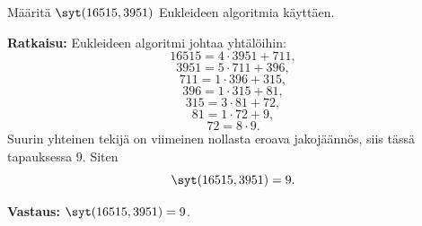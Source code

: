 \begin{esimerkki}
Määritä $\syt(16515,3951)$ Eukleideen
algoritmia käyttäen.

{\bf Ratkaisu:}
Eukleideen algoritmi johtaa yhtälöihin:
\[
16515 = 4 \cdot 3951 + 711,
\]
\[
3951 = 5 \cdot 711 + 396,
\]
\[
711 = 1 \cdot 396 + 315,
\]
\[
396 = 1 \cdot 315 + 81,
\]
\[
315 = 3 \cdot 81 + 72,
\]
\[
81 = 1 \cdot 72 + 9,
\]
\[
72 = 8 \cdot 9.
\]
Suurin yhteinen tekijä on viimeinen nollasta eroava
jakojäännös, siis tässä tapauksessa $9$. Siten
\[
\syt(16515,3951) = 9.
\]

{\bf Vastaus:} $\syt(16515, 3951) = 9$.
\end{esimerkki}



\Harjoitustehtavat


